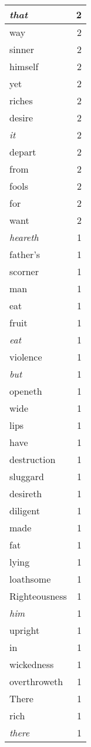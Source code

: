 \begin{center}
\begin{longtable}{l|r}
\emph{that} & 2\\ \hline 
way & 2\\ \hline 
sinner & 2\\ \hline 
himself & 2\\ \hline 
yet & 2\\ \hline 
riches & 2\\ \hline 
desire & 2\\ \hline 
\emph{it} & 2\\ \hline 
depart & 2\\ \hline 
from & 2\\ \hline 
fools & 2\\ \hline 
for & 2\\ \hline 
want & 2\\ \hline 
\emph{heareth} & 1\\ \hline 
father's & 1\\ \hline 
scorner & 1\\ \hline 
man & 1\\ \hline 
eat & 1\\ \hline 
fruit & 1\\ \hline 
\emph{eat} & 1\\ \hline 
violence & 1\\ \hline 
\emph{but} & 1\\ \hline 
openeth & 1\\ \hline 
wide & 1\\ \hline 
lips & 1\\ \hline 
have & 1\\ \hline 
destruction & 1\\ \hline 
sluggard & 1\\ \hline 
desireth & 1\\ \hline 
diligent & 1\\ \hline 
made & 1\\ \hline 
fat & 1\\ \hline 
lying & 1\\ \hline 
loathsome & 1\\ \hline 
Righteousness & 1\\ \hline 
\emph{him} & 1\\ \hline 
upright & 1\\ \hline 
in & 1\\ \hline 
wickedness & 1\\ \hline 
overthroweth & 1\\ \hline 
There & 1\\ \hline 
rich & 1\\ \hline 
\emph{there} & 1\\ \hline 

\end{longtable}
\end{center}
